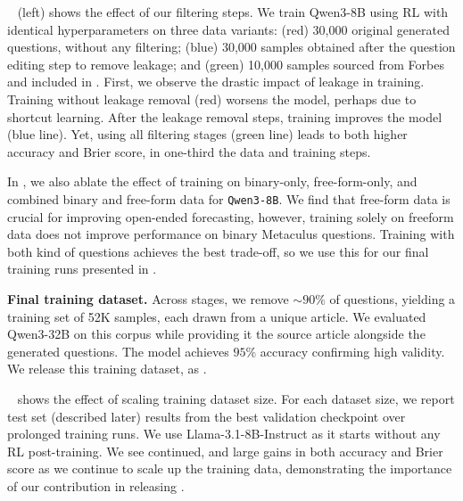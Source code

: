    ~ (left) shows the effect of our filtering steps. We train Qwen3-8B using RL with identical hyperparameters on three data variants: (red) 30,000 original generated questions, without any filtering; (blue) 30,000 samples obtained after the question editing step to remove leakage; and (green) 10,000 samples sourced from Forbes and included in \ourdataset. First, we observe the drastic impact of leakage in training. Training without leakage removal (red) worsens the model, perhaps due to shortcut learning. After the leakage removal steps, training improves the model (blue line). Yet, using all filtering stages (green line) leads to both higher accuracy and Brier score, in one-third the data and training steps. \vspace{0.15cm}

In , we also ablate the effect of training on binary-only, free-form-only, and combined binary and free-form data for \texttt{Qwen3-8B}. We find that free-form data is crucial for improving open-ended forecasting, however, training solely on freeform data does not improve performance on binary Metaculus questions. Training with both kind of questions achieves the best trade-off, so we use this for our final training runs presented in . 

\textbf{Final training dataset.} Across stages, we remove $\sim90\%$ of questions, yielding a training set of 52K samples, each drawn from a unique article. We evaluated Qwen3-32B on this corpus while providing it the source article alongside the generated questions. The model achieves $95\%$ accuracy confirming high validity. We release this training dataset, as {\ourdataset}.

   ~ shows the effect of scaling training dataset size. For each dataset size, we report test set (described later) results from the best validation checkpoint over prolonged training runs. We use Llama-3.1-8B-Instruct as it starts without any RL post-training. We see continued, and large gains in both accuracy and Brier score as we continue to scale up the training data, demonstrating the importance of our contribution in releasing \ourdataset.


